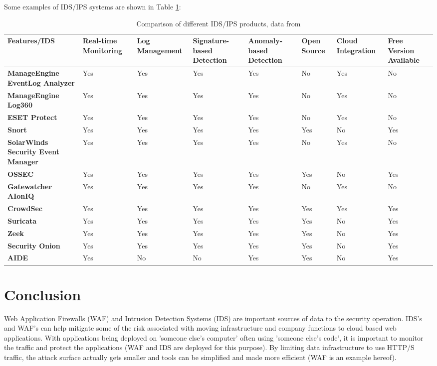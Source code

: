 \documentclass[
	letterpaper, %
	10pt, %
	unnumberedsections, %
	twoside, %
]{APAAssignment}
\begin{document}
Some examples of IDS/IPS systems are shown in Table \ref{tab:IPSProdicts}:

\begin{table}[!ht]
    \centering
    \begin{tabular}{|p{2.2cm}|p{1.5cm}|p{1.5cm}|p{1.5cm}|p{1.5cm}|p{1.5cm}|p{1.5cm}|p{1.5cm}|}
    \hline
        \textbf{Features/IDS} & \textbf{Real-time Monitoring} & \textbf{Log Management} & \textbf{Signature-based Detection} & \textbf{Anomaly-based Detection} & \textbf{Open Source} & \textbf{Cloud Integration} & \textbf{Free Version Available} \\ \hline
        \textbf{ManageEngine EventLog Analyzer} & Yes & Yes & Yes & Yes & No & Yes & No \\ \hline
        \textbf{ManageEngine Log360} & Yes & Yes & Yes & Yes & No & Yes & No \\ \hline
        \textbf{ESET Protect} & Yes & Yes & Yes & Yes & No & Yes & No \\ \hline
        \textbf{Snort} & Yes & Yes & Yes & Yes & Yes & No & Yes \\ \hline
        \textbf{SolarWinds Security Event Manager} & Yes & Yes & Yes & Yes & No & Yes & No \\ \hline
        \textbf{OSSEC} & Yes & Yes & Yes & Yes & Yes & No & Yes \\ \hline
        \textbf{Gatewatcher AIonIQ} & Yes & Yes & Yes & Yes & No & Yes & No \\ \hline
        \textbf{CrowdSec} & Yes & Yes & Yes & Yes & Yes & Yes & Yes \\ \hline
        \textbf{Suricata} & Yes & Yes & Yes & Yes & Yes & No & Yes \\ \hline
        \textbf{Zeek} & Yes & Yes & Yes & Yes & Yes & No & Yes \\ \hline
        \textbf{Security Onion} & Yes & Yes & Yes & Yes & Yes & No & Yes \\ \hline
        \textbf{AIDE} & Yes & No & No & Yes & Yes & No & Yes \\ \hline
    \end{tabular}
	\caption{Comparison of different IDS/IPS products, data from \cite{ComparitechIPSComparison}} 
	\label{tab:IPSProdicts}
\end{table}


\section{Conclusion}
Web Application Firewalls (WAF) and Intrusion Detection Systems (IDS) are important sources of data to the security operation. IDS's and WAF's can help mitigate some of the risk associated with moving infrastructure and company functions to cloud based web applications. With applications being deployed on 'someone else's computer' often using 'someone else's code', it is important to monitor the traffic and protect the applications (WAF and IDS are deployed for this purpose). By limiting data infrastructure to use HTTP/S traffic, the attack surface actually gets smaller and tools can be simplified and made more efficient (WAF is an example hereof). 
\end{document}
